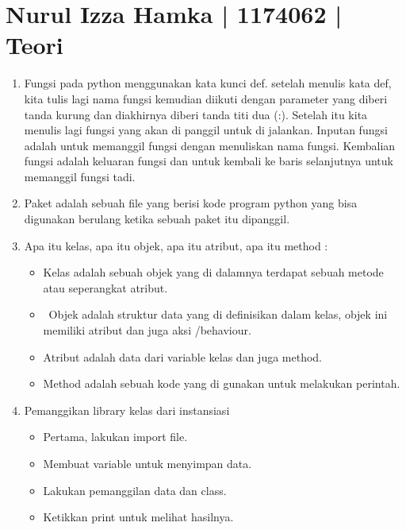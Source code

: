 \section{Nurul Izza Hamka | 1174062 | Teori}
\begin{enumerate}

\item Fungsi pada python menggunakan kata kunci def. setelah menulis kata def, 
kita tulis lagi nama fungsi kemudian diikuti dengan parameter yang diberi tanda kurung dan diakhirnya diberi tanda titi dua (:). 
Setelah itu kita menulis lagi fungsi yang akan di panggil untuk di jalankan.
Inputan fungsi adalah untuk memanggil fungsi dengan menuliskan nama fungsi.
Kembalian fungsi adalah keluaran fungsi dan untuk kembali ke baris selanjutnya untuk memanggil fungsi tadi.


\item Paket adalah sebuah file yang berisi kode program python yang bisa digunakan berulang ketika sebuah paket itu dipanggil.


\item Apa itu kelas, apa itu objek, apa itu atribut, apa itu method  :
\begin{itemize}
\item Kelas adalah sebuah objek yang di dalamnya terdapat sebuah metode atau seperangkat atribut.\\
\item\ Objek adalah struktur data yang di definisikan dalam kelas, objek ini memiliki atribut dan juga aksi /behaviour.\\
\item Atribut adalah data dari variable kelas dan juga method.\\
\item Method adalah sebuah kode yang di gunakan untuk melakukan perintah.
\end{itemize}


\item Pemanggikan library kelas dari instansiasi 
\begin{itemize}
\item Pertama, lakukan import file.\\
\item Membuat variable untuk menyimpan data.\\
\item Lakukan pemanggilan data dan class.\\
\item Ketikkan print untuk melihat hasilnya.\\
\end{itemize}



\end{enumerate}
